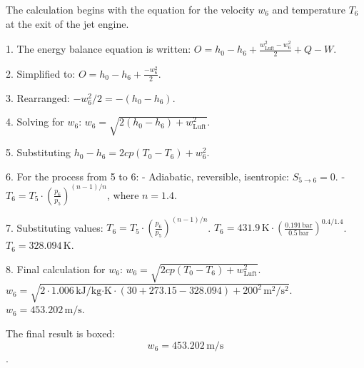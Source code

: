 The calculation begins with the equation for the velocity \( w_6 \) and temperature \( T_6 \) at the exit of the jet engine.  

1. The energy balance equation is written:  
   \( O = h_0 - h_6 + \frac{w_{\text{Luft}}^2 - w_6^2}{2} + Q - W \).  

2. Simplified to:  
   \( O = h_0 - h_6 + \frac{-w_6^2}{2} \).  

3. Rearranged:  
   \( -w_6^2 / 2 = - (h_0 - h_6) \).  

4. Solving for \( w_6 \):  
   \( w_6 = \sqrt{2(h_0 - h_6) + w_{\text{Luft}}^2} \).  

5. Substituting \( h_0 - h_6 = 2cp(T_0 - T_6) + w_6^2 \).  

6. For the process from 5 to 6:  
   - Adiabatic, reversible, isentropic: \( S_{5 \to 6} = 0 \).  
   - \( T_6 = T_5 \cdot \left( \frac{p_6}{p_5} \right)^{(n-1)/n} \), where \( n = 1.4 \).  

7. Substituting values:  
   \( T_6 = T_5 \cdot \left( \frac{p_6}{p_5} \right)^{(n-1)/n} \).  
   \( T_6 = 431.9 \, \text{K} \cdot \left( \frac{0.191 \, \text{bar}}{0.5 \, \text{bar}} \right)^{0.4/1.4} \).  
   \( T_6 = 328.094 \, \text{K} \).  

8. Final calculation for \( w_6 \):  
   \( w_6 = \sqrt{2cp(T_0 - T_6) + w_{\text{Luft}}^2} \).  
   \( w_6 = \sqrt{2 \cdot 1.006 \, \text{kJ/kg·K} \cdot (30 + 273.15 - 328.094) + 200^2 \, \text{m}^2/\text{s}^2} \).  
   \( w_6 = 453.202 \, \text{m/s} \).  

The final result is boxed:  
\[ w_6 = 453.202 \, \text{m/s} \].